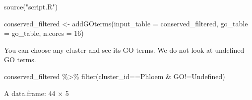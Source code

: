 \documentclass[
  letterpaper,
  DIV=11,
  numbers=noendperiod]{scrartcl}
\newenvironment{Shaded}{}{}
\newcommand{\AttributeTok}[1]{\textcolor[rgb]{0.49,0.56,0.16}{#1}}
\newcommand{\DecValTok}[1]{\textcolor[rgb]{0.25,0.63,0.44}{#1}}
\newcommand{\FunctionTok}[1]{\textcolor[rgb]{0.02,0.16,0.49}{#1}}
\newcommand{\NormalTok}[1]{#1}
\newcommand{\OtherTok}[1]{\textcolor[rgb]{0.00,0.44,0.13}{#1}}
\newcommand{\SpecialCharTok}[1]{\textcolor[rgb]{0.25,0.44,0.63}{#1}}
\newcommand{\StringTok}[1]{\textcolor[rgb]{0.25,0.44,0.63}{#1}}
\begin{document}
\begin{Shaded}
\begin{Highlighting}[]
\FunctionTok{source}\NormalTok{(}\StringTok{"script.R"}\NormalTok{)}
\end{Highlighting}
\end{Shaded}

\begin{Shaded}
\begin{Highlighting}[]
\NormalTok{conserved\_filtered }\OtherTok{\textless{}{-}} \FunctionTok{addGOterms}\NormalTok{(}\AttributeTok{input\_table =}\NormalTok{ conserved\_filtered,}
                                \AttributeTok{go\_table =}\NormalTok{ go\_table,}
                                \AttributeTok{n.cores =} \DecValTok{16}\NormalTok{)}
\end{Highlighting}
\end{Shaded}

You can choose any cluster and see its GO terms. We do not look at
undefined GO terms.

\begin{Shaded}
\begin{Highlighting}[]
\NormalTok{conserved\_filtered }\SpecialCharTok{\%\textgreater{}\%} \FunctionTok{filter}\NormalTok{(cluster\_id}\SpecialCharTok{==}\StringTok{\textquotesingle{}Phloem\textquotesingle{}} \SpecialCharTok{\&}\NormalTok{ GO}\SpecialCharTok{!=}\StringTok{\textquotesingle{}Undefined\textquotesingle{}}\NormalTok{)}
\end{Highlighting}
\end{Shaded}

A data.frame: 44 × 5
\end{document}
